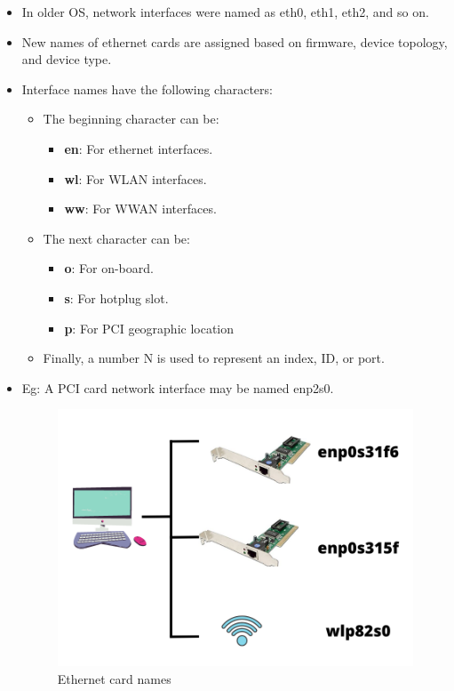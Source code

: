 \setlength{\columnsep}{3pt}
\begin{flushleft}
	\bigskip
	\begin{itemize}
		\item In older OS, network interfaces were named as eth0, eth1, eth2, and so on.
		\item New names of ethernet cards are assigned based on firmware, device topology, and device type. 
		\item Interface names have the following characters:
		\begin{itemize}
			\item The beginning character can be: 
			\begin{itemize}
				\item \textbf{en}: For ethernet interfaces.
				\item \textbf{wl}: For WLAN interfaces.
				\item \textbf{ww}: For WWAN interfaces.
			\end{itemize}
			\item The next character can be: 
			\begin{itemize}
				\item \textbf{o}: For on-board.
				\item \textbf{s}: For hotplug slot.
				\item \textbf{p}: For PCI geographic location
			\end{itemize}		
			\item Finally, a number N is used to represent an index, ID, or port.
		\end{itemize}
		\item Eg: A PCI card network interface may be named enp2s0.
		\begin{figure}[h!]
			\centering
			\includegraphics[scale=0.45]{content/chapter14/images/naming.png}
			\caption{Ethernet card names}
			\label{fig:severity266}
		\end{figure}			
		

	\end{itemize}
	
 \end{flushleft}
\newpage


